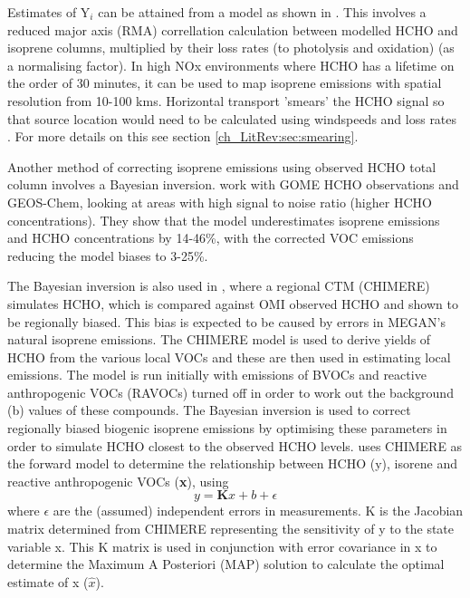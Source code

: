     Estimates of Y$_i$ can be attained from a model as shown in \citet{Millet2006}.
    This involves a reduced major axis (RMA) correllation calculation between modelled HCHO and isoprene columns, multiplied by their loss rates (to photolysis and oxidation) (as a normalising factor).  
    In high NOx environments where HCHO has a lifetime on the order of 30 minutes, it can be used to map isoprene emissions with spatial resolution from 10-100 kms.
    Horizontal transport 'smears' the HCHO signal so that source location would need to be calculated using windspeeds and loss rates \citep{Palmer2001,Palmer2003}.
    For more details on this see section \ref{ch_LitRev:sec:smearing}.
    
    Another method of correcting isoprene emissions using observed HCHO total column involves a Bayesian inversion.
    \citet{Shim2005} work with GOME HCHO observations and GEOS-Chem, looking at areas with high signal to noise ratio (higher HCHO concentrations).
    They show that the model underestimates isoprene emissions and HCHO concentrations by 14-46\%, with the corrected VOC emissions reducing the model biases to 3-25\%.
    
    The Bayesian inversion is also used in \citet{Curci2010}, where a regional CTM (CHIMERE) simulates HCHO, which is compared against OMI observed HCHO and shown to be regionally biased.
    This bias is expected to be caused by errors in MEGAN's natural isoprene emissions.
    The CHIMERE model is used to derive yields of HCHO from the various local VOCs and these are then used in estimating local emissions.
    The model is run initially with emissions of BVOCs and reactive anthropogenic VOCs (RAVOCs) turned off in order to work out the background (b) values of these compounds.
    The Bayesian inversion is used to correct regionally biased biogenic isoprene emissions by optimising these parameters in order to simulate HCHO closest to the observed HCHO levels.
    \cite{Curci2010} uses CHIMERE as the forward model to determine the relationship between HCHO (y), isorene and reactive anthropogenic VOCs (\textbf{x}), using 
    \begin{equation}
        y=\mathbf{K}x + b + \epsilon
    \end{equation}
    where $\epsilon$ are the (assumed) independent errors in measurements.
    K is the Jacobian matrix determined from CHIMERE representing the sensitivity of y to the state variable x.
    This K matrix is used in conjunction with error covariance in x to determine the Maximum A Posteriori (MAP) solution to calculate the optimal estimate of x ($\hat{x}$).
    
